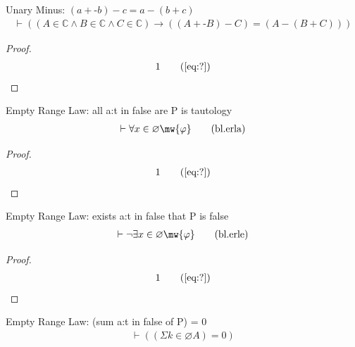 \begin{lemma} Unary Minus: $( a + \textrm{-} b )
\minus c = a \minus ( b + c )$
\begin{align}
\vdash ( ( A \in \mathbb{C} \wedge B \in \mathbb{C} \wedge C \in \mathbb{C} )
    \rightarrow ( ( A + \textrm{-} B ) \minus C ) = ( A \minus ( B + C ) )
    )\label{eq:bl.addusub}\tag{bl.addusub}
\end{align}
\end{lemma}

\begin{proof}
\begin{align}
  1 &&  & &(\mbox{\ref{eq:?}})\notag
\end{align}
\end{proof}

\begin{lemma} Empty Range Law: all a:t in false are P is
tautology
\begin{align}
\vdash \forall x \in \varnothing \mw{\varphi}\label{eq:bl.erla}\tag{bl.erla}
\end{align}
\end{lemma}

\begin{proof}
\begin{align}
  1 &&  & &(\mbox{\ref{eq:?}})\notag
\end{align}
\end{proof}

\begin{lemma} Empty Range Law: exists a:t in false that P
is false
\begin{align}
\vdash \lnot \exists x \in \varnothing
    \mw{\varphi}\label{eq:bl.erle}\tag{bl.erle}
\end{align}
\end{lemma}

\begin{proof}
\begin{align}
  1 &&  & &(\mbox{\ref{eq:?}})\notag
\end{align}
\end{proof}

\begin{lemma} Empty Range Law: (sum a:t in false of P) =
0
\begin{align}
\vdash ( ( \Sigma k \in \varnothing A ) = 0 )\label{eq:bl.erls}\tag{bl.erls}
\end{align}
\end{lemma}

